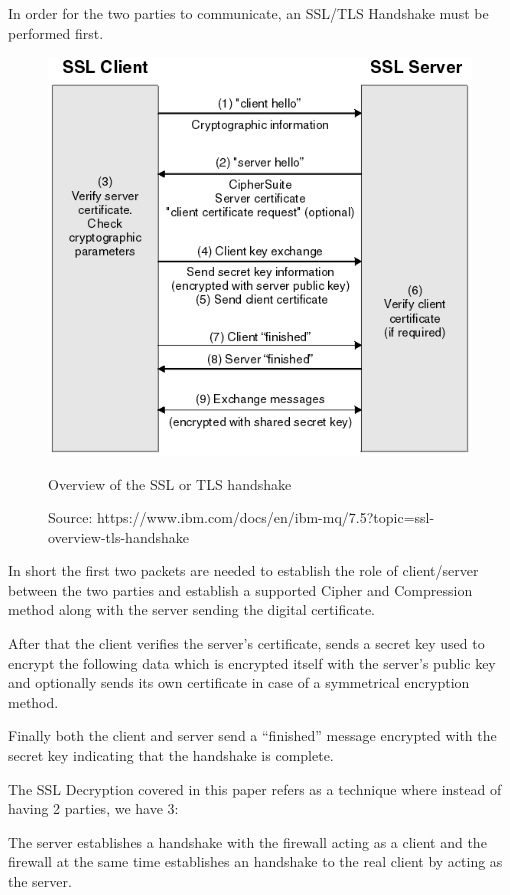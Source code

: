 \documentclass[status=normal,cover=tesi,language=en]{gmeepd}
\begin{document}
\pagebreak

In order for the two parties to communicate, an SSL/TLS Handshake must be performed first.


\begin{figure}[!hb]
 \centering
 \includegraphics[width=13cm]{img/ssl_handshake.png}
 \caption{Overview of the SSL or TLS handshake}
 \caption*{Source: https://www.ibm.com/docs/en/ibm-mq/7.5?topic=ssl-overview-tls-handshake}
 \label{SSL handshake}
\end{figure}

In short the first two packets are needed to establish the role of client/server between the two parties and establish a supported Cipher and Compression method along with the server sending the digital certificate.

After that the client verifies the server's certificate, sends a secret key used to encrypt the following data which is encrypted itself with the server's public key and optionally sends its own certificate in case of a symmetrical encryption method.

Finally both the client and server send a ``finished'' message encrypted with the secret key indicating that the handshake is complete.

The SSL Decryption covered in this paper refers as a technique where instead of having  2 parties, we have 3:

The server establishes a handshake with the firewall acting as a client and the firewall at the same time establishes an handshake to the real client by acting as the server.
\end{document}
